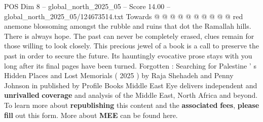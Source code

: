 \begin{textsample}{POS Dim 8 – global\_north\_2025\_05 – Score 14.00 – global\_north\_2025\_05/124673514.txt}
Towards @ @ @ @ @ @ @ @ @ @ red anemone blossoming amongst the rubble and ruins that dot the Ramallah hills.
There is always hope.
The past can never be completely erased, clues remain for those willing to look closely.
This precious jewel of a book is a call to preserve the past in order to secure the future.
Its hauntingly evocative prose stays with you long after its final pages have been turned.
Forgotten : Searching for Palestine ' s Hidden Places and Lost Memorials ( 2025 ) by Raja Shehadeh and Penny Johnson in published by Profile Books Middle East Eye delivers independent and \textbf{unrivalled} \textbf{coverage} and analysis of the Middle East, North Africa and beyond.
To learn more about \textbf{republishing} this content and the \textbf{associated} \textbf{fees}, \textbf{please} \textbf{fill} out this form.
More about \textbf{MEE} can be found here.

\end{textsample}
